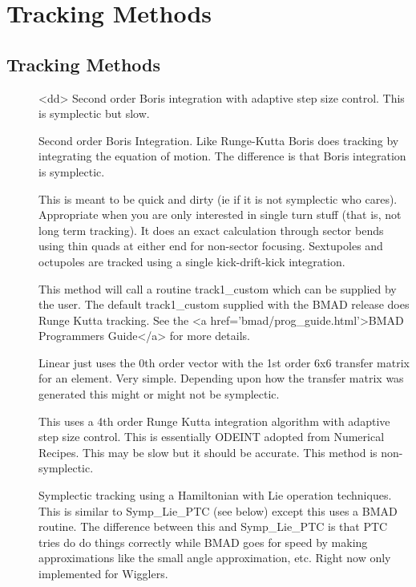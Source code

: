 \chapter{Tracking Methods}

\section{Tracking Methods}

\begin{description}
\item[]
<dd> Second order Boris integration with adaptive step size control.
This is symplectic but slow.

\item[]
Second order Boris Integration. Like Runge-Kutta Boris does tracking by
integrating the equation of motion. The difference is that Boris integration
is symplectic.

\item[]
This is meant to be quick and dirty (ie if it is not symplectic
who cares). Appropriate when you are only interested in single turn stuff
(that is, not long term tracking). It
does an exact calculation through sector bends using thin quads at either end
for non-sector focusing. Sextupoles and octupoles are tracked using a single
kick-drift-kick integration.

\item[]
This method will call a routine track1\_custom which can be supplied by
the user. The default track1\_custom supplied with the BMAD release does
Runge Kutta tracking. See the
<a href='bmad/prog\_guide.html'>BMAD Programmers Guide</a> for more details.

\item[]
Linear just uses the 0th order vector with the 1st order 6x6 transfer
matrix for an element. Very simple.
Depending upon how the transfer matrix was generated this might or might not
be symplectic.

\item[]
This uses a 4th order Runge Kutta integration algorithm with
adaptive step size control.
This is essentially ODEINT adopted from Numerical Recipes. This
may be slow but it should be accurate. This method is non-symplectic.

\item[]
Symplectic tracking using a Hamiltonian with Lie operation techniques.
This is similar to Symp\_Lie\_PTC (see below) except this uses a BMAD routine.
The difference between this and Symp\_Lie\_PTC is that PTC tries do do things
correctly while BMAD goes for speed by making approximations like the small
angle approximation, etc. Right now only implemented for Wigglers.


\end{description}
